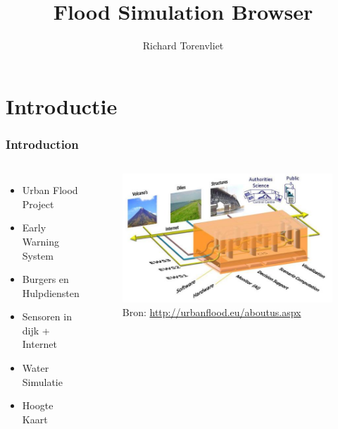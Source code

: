 \documentclass[10pt,a4paper]{beamer}
\author{Richard Torenvliet}
\title{Flood Simulation Browser}
\begin{document}
\begin{frame}
\maketitle
\end{frame}
\section{Introductie}
\begin{frame}
\frametitle{Introduction}
\begin{columns}[c]
\column{1.5in}
\begin{itemize}
\item Urban Flood Project
\item Early Warning System
\item Burgers en Hulpdiensten
\item Sensoren in dijk + Internet
\item Water Simulatie
\item Hoogte Kaart
\end{itemize}
\column{2.0in}
\begin{figure}
\includegraphics[scale=0.3]{concept.png}
\caption{Bron: \url{http://urbanflood.eu/aboutus.aspx}}
\end{figure}
\end{columns}
\end{frame}
\end{document}
